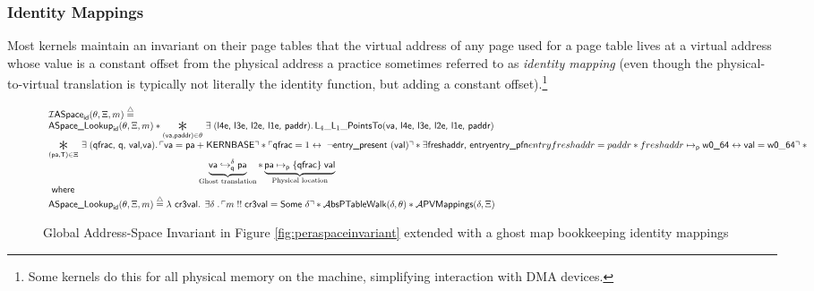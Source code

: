 \subsubsection{Identity Mappings}
\label{subsec:identitymappings}
Most kernels maintain an invariant on their page tables that the virtual address of any page used for a page table lives at a virtual address
whose value is a constant offset from the physical address a practice sometimes referred to as \emph{identity mapping} (even though the physical-to-virtual translation
is typically not literally the identity function, but adding a constant offset).\footnote{Some kernels do this for all physical memory on the machine, simplifying interaction
with DMA devices.}
\begin{figure*}
\footnotesize
{}
\[
\begin{array}{l}
  \mathcal{I}\textsf{ASpace}_{\textsf{id}}(\ptablestore,\Xi,m)\stackrel{\triangle}{=}\\ \textsf{ASpace\_Lookup}_{\textsf{id}}(\ptablestore,\Xi,m) \ast 
  \bigast{(\vaddr, \textsf{paddr})\in \ptablestore}{\exists\;(\textsf{l4e, l3e, l2e, l1e, paddr})\ldotp \textsf{L}_{4}\_\textsf{L}_{1}\_\textsf{PointsTo}(\vaddr\textsf{, l4e, l3e, l2e, l1e, paddr})} \\
  \bigast{(\paddr,\mathsf{T}) \in \Xi}{\exists\; (\textsf{qfrac, q, val,}\vaddr) \ldotp \ulcorner \vaddr = \paddr + \textsf{KERNBASE} \urcorner \ast \ulcorner \textsf{qfrac} = 1 \leftrightarrow \; \lnot\textsf{entry\_present }(\vale) \urcorner \ast
   \exists \textsf{freshaddr, entry} \textsf{entry\_pfn} entry freshaddr = paddr \ast freshaddr \mapsto_{\textsf{p}} \textsf{w0\_64}  \leftrightarrow \mathsf{val} = \mathsf{w0\_64}\urcorner \; \ast\\
   \qquad\qquad\qquad\qquad\qquad\qquad\qquad\qquad   \underbrace{\fracghostmaptoken{\delta}{\vaddr}{\paddr}{\qfrac} }_\text{Ghost translation} \ast 
\underbrace{\paddr \mapsto_{\mathsf{p}}\{\textsf{qfrac}\}\; \vale}_\text{Physical location}}\\
  \textsf{ where } \\
   \textsf{ASpace\_Lookup}_{\textsf{id}}(\ptablestore,\Xi,m) \stackrel{\triangle}{=} \lambda\textsf{ cr3val} \ldotp \; \exists \gammaPred \; \ldotp \ulcorner m \; !!\; \textsf{cr3val} = \textsf{Some } \gammaPred \urcorner \ast
   \ptableabswalk{\delta,\ptablestore} \ast \pvmapping{\delta,\Xi}
  
\end{array}
\]
\vspace{-1em}
\caption{Global Address-Space Invariant in Figure \ref{fig:peraspaceinvariant} extended with a ghost map bookkeeping identity mappings }
  \label{fig:peraspaceinvariant_with_p2v_extension}
\end{figure*}

